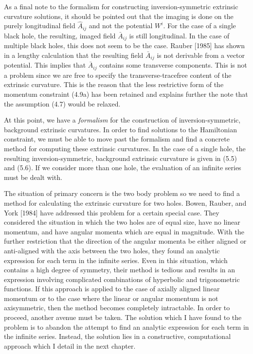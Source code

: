 As a final note to the formalism for constructing inversion-symmetric extrinsic
curvature solutions, it should be pointed out that the imaging is done on the
purely longitudinal field $\hat{A}_{ij}$ and not the potential $W^i$.  For the case
of a single black hole, the resulting, imaged field $\bar{A}_{ij}$ is still
longitudinal.  In the case of multiple black holes, this does not seem to be the
case.  Rauber [1985] has shown in a lengthy calculation that the resulting field
$\bar{A}_{ij}$ is not derivable from a vector potential.  This implies that
$\bar{A}_{ij}$ contains some transverse components.  This is not a problem since we
are free to specify the transverse-tracefree content of the extrinsic curvature. 
This is the reason that the less restrictive form of the momentum constraint (4.9a)
has been retained and explains further the note that the assumption (4.7) would be
relaxed.

At this point, we have a {\it formalism} for the construction of
inversion-symmetric, background extrinsic curvatures.  In order to find solutions to
the Hamiltonian constraint, we must be able to move past the formalism and find a
concrete method for computing these extrinsic curvatures.  In the case of a single
hole, the resulting inversion-symmetric, background extrinsic curvature is given in
(5.5) and (5.6).  If we consider more than one hole, the evaluation of an infinite
series must be dealt with.

The situation of primary concern is the two body problem so we need to find a
method for calculating the extrinsic curvature for two holes.  Bowen, Rauber,
and York [1984] have addressed this problem for a certain special case.  They
considered the situation in which the two holes are of equal size, have no
linear momentum, and have angular momenta which are equal in magnitude.  With
the further restriction that the direction of the angular momenta be either
aligned or anti-aligned with the axis between the two holes, they found an
analytic expression for each term in the infinite series.  Even in this
situation, which contains a high degree of symmetry, their method is tedious and
results in an expression involving complicated combinations of hyperbolic and
trigonometric functions.  If this approach is applied to the case of axially
aligned linear momentum or to the case where the linear or angular momentum is
not axisymmetric, then the method becomes completely intractable.  In order to
proceed, another avenue must be taken.  The solution which I have found to the
problem is to abandon the attempt to find an analytic expression for each term
in the infinite series.  Instead, the solution lies in a constructive,
computational approach which I detail in the next chapter.
\vfill
\eject
